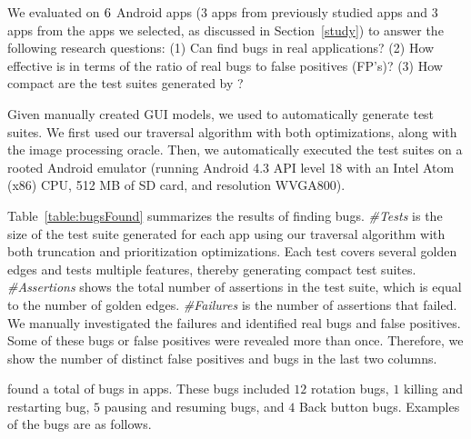 \label{evaluation}

We evaluated \tool{} on $\textsc{6}$ Android apps ($3$ apps from previously studied apps and $3$ apps from the apps
we selected, as discussed in Section~\ref{study}) to answer the
following research questions:
(1) Can \tool{} find bugs in real applications?
(2) How effective is \tool{} in terms of the ratio of real bugs to false positives (FP's)?
(3) How compact are the test suites generated by \tool?

Given manually created GUI models, we used \tool{} to automatically
generate test suites. We first used our traversal algorithm with both optimizations, along with
the image processing oracle. Then, we automatically executed the test
suites on a rooted Android emulator (running Android 4.3 API level 18
with an Intel Atom (x86) CPU, 512 MB of SD card, and resolution
WVGA800).



Table~\ref{table:bugsFound} summarizes the results of finding bugs.
\emph{\#Tests} is the size of the test suite generated for each app
using our traversal algorithm with both truncation and prioritization
optimizations. Each test covers several golden edges and tests multiple features, 
thereby generating compact test suites.
\emph{\#Assertions} shows the total number of assertions in the test
suite, which is equal to the number of golden edges. \emph{\#Failures} is the number of assertions that failed. We
manually investigated the failures and identified real bugs and false
positives. Some of these bugs or false positives were revealed more
than once. Therefore, we show the number of distinct false positives
and bugs in the last two columns.

\tool{} found a total of \NumBugs{} bugs in \NumApps{} apps. These bugs included $12$ rotation bugs, $1$ killing and restarting bug, $5$ pausing and resuming bugs, and $4$ Back button bugs. Examples of the bugs are as follows.

